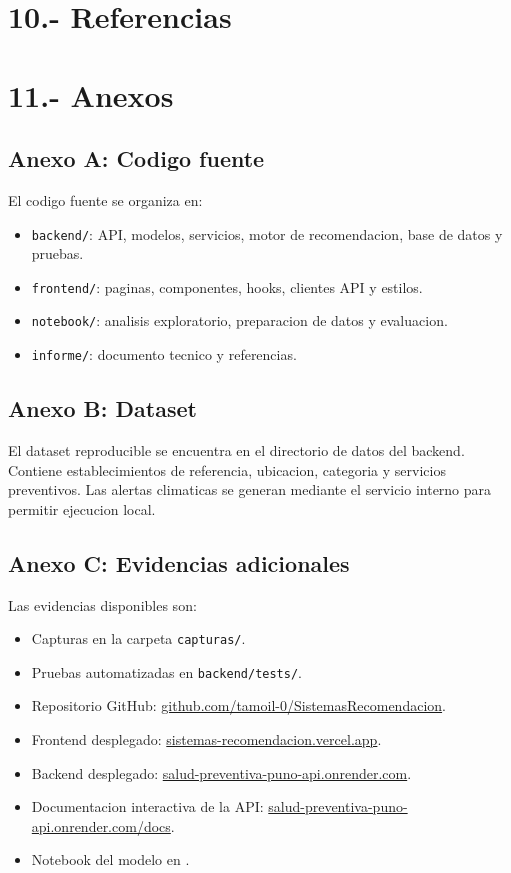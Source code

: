 \documentclass[12pt,a4paper]{article}
\begin{document}
\section{10.- Referencias}
\renewcommand{\refname}{}
\vspace{-1.2cm}

\nocite{sun2023,akbari2023,vieira2023,ooi2023}


\clearpage
\section{11.- Anexos}
\subsection{Anexo A: Codigo fuente}
El codigo fuente se organiza en:
\begin{itemize}[leftmargin=*]
  \item \texttt{backend/}: API, modelos, servicios, motor de recomendacion, base de datos y pruebas.
  \item \texttt{frontend/}: paginas, componentes, hooks, clientes API y estilos.
  \item \texttt{notebook/}: analisis exploratorio, preparacion de datos y evaluacion.
  \item \texttt{informe/}: documento tecnico y referencias.
\end{itemize}

\subsection{Anexo B: Dataset}
El dataset reproducible se encuentra en el directorio de datos del backend. Contiene establecimientos de referencia, ubicacion, categoria y servicios preventivos. Las alertas climaticas se generan mediante el servicio interno para permitir ejecucion local.

\subsection{Anexo C: Evidencias adicionales}
Las evidencias disponibles son:
\begin{itemize}[leftmargin=*]
  \item Capturas en la carpeta \texttt{capturas/}.
  \item Pruebas automatizadas en \texttt{backend/tests/}.
  \item Repositorio GitHub: \href{https://github.com/tamoil-0/SistemasRecomendacion.git}{github.com/tamoil-0/SistemasRecomendacion}.
  \item Frontend desplegado: \href{https://sistemas-recomendacion.vercel.app}{sistemas-recomendacion.vercel.app}.
  \item Backend desplegado: \href{https://salud-preventiva-puno-api.onrender.com}{salud-preventiva-puno-api.onrender.com}.
  \item Documentacion interactiva de la API: \href{https://salud-preventiva-puno-api.onrender.com/docs}{salud-preventiva-puno-api.onrender.com/docs}.
  \item Notebook del modelo en .
\end{itemize}
\end{document}
